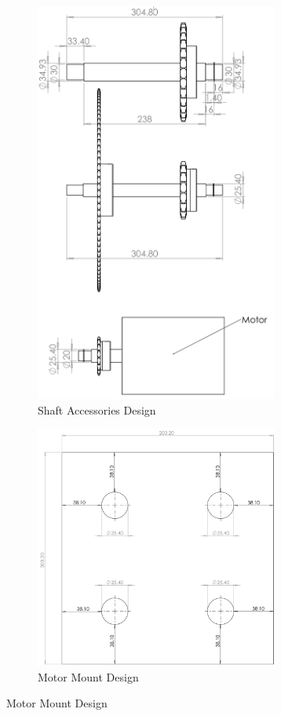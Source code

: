 \documentclass[letterpaper,12pt]{article}
\begin{document}
\begin{figure}[!h]
\centering
  \begin{subfigure}[b]{0.45\textwidth}
    \includegraphics[width=8cm]{A3/shaft_drawing.png}
    \caption{Shaft Accessories Design}
    \label{fig:1}
  \end{subfigure}
  \begin{subfigure}[b]{0.45\textwidth}
    \includegraphics[width=8cm]{A3/mount_drawing.png}
    \caption{Motor Mount Design}
    \label{fig:2}
  \end{subfigure}
\end{figure}
\end{document}
